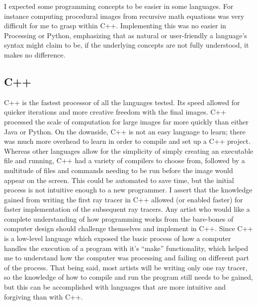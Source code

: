 I expected some programming concepts to be easier in some languages.  For instance computing procedural images from recursive math equations was very difficult for me to grasp within C++.  Implementing this was no easier in Processing or Python, emphasizing that as natural or user-friendly a language's syntax might claim to be, if the underlying concepts are not fully understood, it makes no difference.  

\subsection{C++}
C++ is the fastest processor of all the languages tested.  Its speed allowed for quicker iterations and more creative freedom with the final images.  C++ processed the scale of computation for large images far more quickly than either Java or Python.  On the downside, C++ is not an easy language to learn; there was much more overhead to learn in order to compile and set up a C++ project.  Whereas other languages allow for the simplicity of simply creating an executable file and running, C++ had a variety of compilers to choose from, followed by a multitude of files and commands needing to be run before the image would appear on the screen.  This could be automated to save time, but the initial process is not intuitive enough to a new programmer.  I assert that the knowledge gained from writing the first ray tracer in C++ allowed (or enabled faster) for faster implementation of the subsequent ray tracers. Any artist who would like a complete understanding of how programming works from the bare-bones of computer design should challenge themselves and implement in C++.  Since C++ is a low-level language which exposed the basic process of how a computer handles the execution of a program with it's ``make'' functionality, which helped me to understand how the computer was processing and failing on different part of the process.  That being said, most artists will be writing only one ray tracer, so the knowledge of how to compile and run the program still needs to be gained, but this can be accomplished with languages that are more intuitive and forgiving than with C++.

